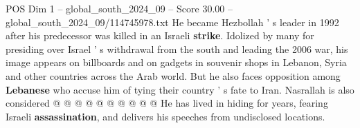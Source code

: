 \begin{textsample}{POS Dim 1 – global\_south\_2024\_09 – Score 30.00 – global\_south\_2024\_09/114745978.txt}
He became Hezbollah ' s leader in 1992 after his predecessor was killed in an Israeli \textbf{strike}.
Idolized by many for presiding over Israel ' s withdrawal from the south and leading the 2006 war, his image appears on billboards and on gadgets in souvenir shops in Lebanon, Syria and other countries across the Arab world.
But he also faces opposition among \textbf{Lebanese} who accuse him of tying their country ' s fate to Iran.
Nasrallah is also considered @ @ @ @ @ @ @ @ @ @ He has lived in hiding for years, fearing Israeli \textbf{assassination}, and delivers his speeches from undisclosed locations.

\end{textsample}
